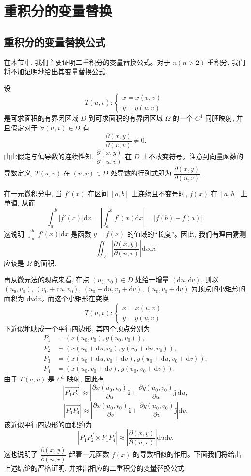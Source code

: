 \section{重积分的变量替换}
\label{sec:ma-15-4}

\subsection{重积分的变量替换公式}
\label{subsec:ma-15-4-1}

在本节中, 我们主要证明二重积分的变量替换公式。对于 $n(n>2)$ 重积分, 我们将不加证明地给出其变量替换公式.

设
\[
  T(u,v):
  \begin{cases}
    x=x(u,v),\\
    y=y(u,v)
  \end{cases}
\]
是可求面积的有界闭区域 $D$ 到可求面积的有界闭区域 $\Omega$ 的一个 $C^1$ 同胚映射, 并且假定对于 $\forall(u,v)\in D$ 有
\[
  \frac{\partial(x,y)}{\partial(u,v)}\ne0.
\]
由此假定与偏导数的连续性知, $\dfrac{\partial(x,y)}{\partial(u,v)}$ 在 $D$ 上不改变符号。注意到向量函数的导数定义, $T(u,v)$ 在 $(u,v)\in D$ 处导数的行列式即为 $\dfrac{\partial(x,y)}{\partial(u,v)}$.

在一元微积分中, 当 $f'(x)$ 在区间 $[a,b]$ 上连续且不变号时, $f(x)$ 在 $[a,b]$ 上单调, 从而
\[
  \int_a^b|f'(x)|\mathrm dx
  =\left|\int_a^bf'(x)\mathrm dx\right|
  =|f(b)-f(a)|.
\]
这说明 $\int_a^b|f'(x)|\mathrm dx$ 是函数 $y=f(x)$ 的值域的“长度”。因此, 我们有理由猜测
\[
  \iint_D\left|\frac{\partial(x,y)}{\partial(u,v)}\right|\mathrm du\mathrm dv
\]
应该是 $\Omega$ 的面积.

再从微元法的观点来看, 在点 $(u_0,v_0)\in D$ 处给一增量 $(\mathrm du,\mathrm dv)$, 则以 $(u_0,v_0)$, $(u_0+\mathrm du,v_0)$, $(u_0+\mathrm du,v_0+\mathrm dv)$, $(u_0,v_0+\mathrm dv)$ 为顶点的小矩形的面积为 $\mathrm du\mathrm dv$。而这个小矩形在变换
\[
  T(u,v):
  \begin{cases}
    x=x(u,v),\\
    y=y(u,v)
  \end{cases}
\]
下近似地映成一个平行四边形, 其四个顶点分别为
\[
\begin{aligned}
  P_1&=(x(u_0,v_0),y(u_0,v_0)),\\
  P_2&=(x(u_0+\mathrm du,v_0),y(u_0+\mathrm du,v_0)),\\
  P_3&=(x(u_0+\mathrm du,v_0+\mathrm dv),y(u_0+\mathrm du,v_0+\mathrm dv)),\\
  P_4&=(x(u_0,v_0+\mathrm dv),y(u_0,v_0+\mathrm dv)).
\end{aligned}
\]
由于 $T(u,v)$ 是 $C^1$ 映射, 因此有
\[
  |\overrightarrow{P_1P_2}|\approx
  \left|\frac{\partial x(u_0,v_0)}{\partial u}\boldsymbol i
  +\frac{\partial y(u_0,v_0)}{\partial u}\boldsymbol j\right|\mathrm du,
\]
\[
  |\overrightarrow{P_1P_4}|\approx
  \left|\frac{\partial x(u_0,v_0)}{\partial v}\boldsymbol i
  +\frac{\partial y(u_0,v_0)}{\partial v}\boldsymbol j\right|\mathrm dv.
\]
该近似平行四边形的面积约为
\[
  |\overrightarrow{P_1P_2}\times\overrightarrow{P_1P_4}|
  \approx
  \left|\frac{\partial(x,y)}{\partial(u,v)}\right|\mathrm du\mathrm dv.
\]
这也说明了 $\dfrac{\partial(x,y)}{\partial(u,v)}$ 起着一元函数 $f(x)$ 的导数相似的作用。下面我们将给出上述结论的严格证明, 并推出相应的二重积分的变量替换公式.

